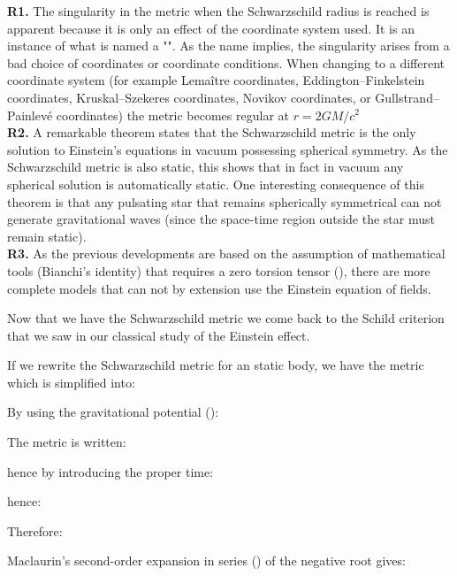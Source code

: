 	\begin{tcolorbox}[title=Remarks,colframe=black,arc=10pt]
	\textbf{R1.} The singularity in the metric when the Schwarzschild radius is reached is apparent because it is only an effect of the coordinate system used. It is an instance of what is named a "". As the name implies, the singularity arises from a bad choice of coordinates or coordinate conditions. When changing to a different coordinate system (for example Lemaître coordinates, Eddington–Finkelstein coordinates, Kruskal–Szekeres coordinates, Novikov coordinates, or Gullstrand–Painlevé coordinates) the metric becomes regular at $r=2GM/c^2$\\
	
	\textbf{R2.} A remarkable theorem states that the Schwarzschild metric is the only solution to Einstein's equations in vacuum possessing spherical symmetry. As the Schwarzschild metric is also static, this shows that in fact in vacuum any spherical solution is automatically static. One interesting consequence of this theorem is that any pulsating star that remains spherically symmetrical can not generate gravitational waves (since the space-time region outside the star must remain static).\\
	
	\textbf{R3.} As the previous developments are based on the assumption of mathematical tools (Bianchi's identity) that requires a zero torsion tensor (), there are more complete models that can not by extension use the Einstein equation of fields.
	\end{tcolorbox}	
	Now that we have the Schwarzschild metric we come back to the Schild criterion that we saw in our classical study of the Einstein effect.

	If we rewrite the Schwarzschild metric for an static body, we have the metric which is simplified into:
	
	By using the gravitational potential ():
	
	The metric is written:
	
	hence by introducing the proper time:
	
	hence:
	
	Therefore:
	
	Maclaurin's second-order expansion in series () of the negative root gives:
	
